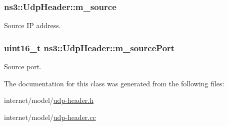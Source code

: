 \subsubsection[{\texorpdfstring{m\+\_\+source}{m_source}}]{ ns3\+::\+Udp\+Header\+::m\+\_\+source\hspace{0.3cm}{\ttfamily [private]}}\hypertarget{classns3_1_1UdpHeader_a66f5c7867ba9da25c94a4c947f4e9e6c}{}\label{classns3_1_1UdpHeader_a66f5c7867ba9da25c94a4c947f4e9e6c}


Source IP address. 

\subsubsection[{\texorpdfstring{m\+\_\+source\+Port}{m_sourcePort}}]{\setlength{\rightskip}{0pt plus 5cm}uint16\+\_\+t ns3\+::\+Udp\+Header\+::m\+\_\+source\+Port\hspace{0.3cm}{\ttfamily [private]}}\hypertarget{classns3_1_1UdpHeader_aa773b19b0bfe6a9eadfb49165065af40}{}\label{classns3_1_1UdpHeader_aa773b19b0bfe6a9eadfb49165065af40}


Source port. 



The documentation for this class was generated from the following files\+:\begin{DoxyCompactItemize}
\item 
internet/model/\hyperlink{udp-header_8h}{udp-\/header.\+h}\item 
internet/model/\hyperlink{udp-header_8cc}{udp-\/header.\+cc}\end{DoxyCompactItemize}

